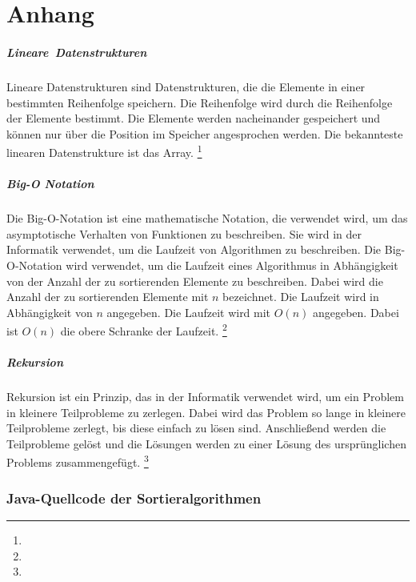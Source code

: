 \documentclass[./entry.tex]{subfiles}
\begin{document}
    \chapter{Anhang}

    \paragraph{Lineare\ Datenstrukturen}
    Lineare Datenstrukturen sind Datenstrukturen, die die Elemente in einer bestimmten Reihenfolge speichern. Die
    Reihenfolge wird durch die Reihenfolge der Elemente bestimmt. Die Elemente werden nacheinander gespeichert und
    können nur über die Position im Speicher angesprochen werden. Die bekannteste linearen Datenstrukture ist
    das Array.
    \footnote{}

    \paragraph{Big-O Notation}
    Die Big-O-Notation ist eine mathematische Notation, die verwendet wird, um das asymptotische Verhalten von
    Funktionen zu beschreiben. Sie wird in der Informatik verwendet, um die Laufzeit von Algorithmen zu beschreiben.
    Die Big-O-Notation wird verwendet, um die Laufzeit eines Algorithmus in Abhängigkeit von der Anzahl der zu
    sortierenden Elemente zu beschreiben. Dabei wird die Anzahl der zu sortierenden Elemente mit $n$ bezeichnet.
    Die Laufzeit wird in Abhängigkeit von $n$ angegeben. Die Laufzeit wird mit $O(n)$ angegeben. Dabei ist $O(n)$
    die obere Schranke der Laufzeit.
    \footnote{}

    \paragraph{Rekursion}
    Rekursion ist ein Prinzip, das in der Informatik verwendet wird, um ein Problem in kleinere Teilprobleme zu
    zerlegen. Dabei wird das Problem so lange in kleinere Teilprobleme zerlegt, bis diese einfach zu lösen sind.
    Anschließend werden die Teilprobleme gelöst und die Lösungen werden zu einer Lösung des ursprünglichen Problems
    zusammengefügt.
    \footnote{}


    \subsection{Java-Quellcode der Sortieralgorithmen}
\end{document}
